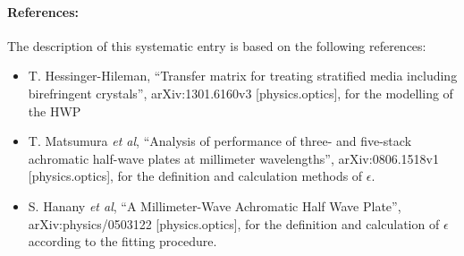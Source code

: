 \paragraph{References:}
The description of this systematic entry is based on the following references:
\begin{itemize}
\item T. Hessinger-Hileman, ``Transfer matrix for treating stratified media including birefringent crystals'', arXiv:1301.6160v3 [physics.optics], for the modelling of the HWP
\item T. Matsumura \textit{et al}, ``Analysis of performance of three- and five-stack achromatic half-wave plates at millimeter wavelengths'', arXiv:0806.1518v1 [physics.optics], for the definition and calculation methods of $\epsilon$.
\item S. Hanany \textit{et al}, ``A Millimeter-Wave Achromatic Half Wave Plate'', arXiv:physics/0503122 [physics.optics], for the definition and calculation of $\epsilon$ according to the fitting procedure.
\end{itemize}

